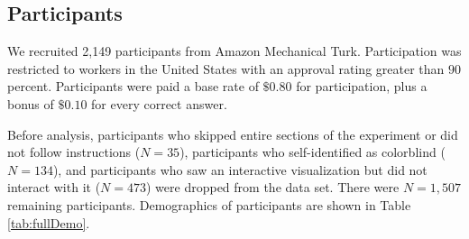 \subsection{Participants}
We recruited 2,149 participants from Amazon Mechanical Turk. Participation was restricted to workers in the United States with an approval rating greater than $90$ percent. Participants were paid a base rate of $\$0.80$ for participation, plus a bonus of $\$0.10$ for every correct answer. 

Before analysis, participants who skipped entire sections of the experiment or did not follow instructions ($N = 35$), participants who self-identified as colorblind ($N = 134$), and participants who saw an interactive visualization but did not interact with it ($N = 473$) were dropped from the data set. 
There were $N = 1,507$ remaining participants. Demographics of participants are shown in Table \ref{tab:fullDemo}.  

